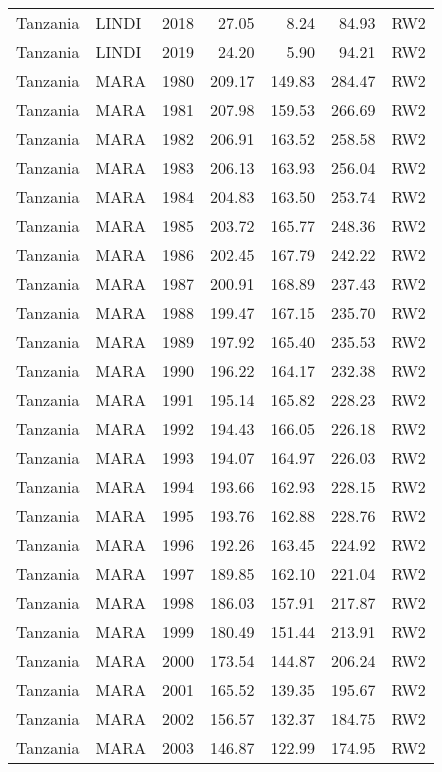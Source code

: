 \begin{longtable}{lllrrrl}
  Tanzania & LINDI & 2018 & 27.05 & 8.24 & 84.93 & RW2 \\ 
  Tanzania & LINDI & 2019 & 24.20 & 5.90 & 94.21 & RW2 \\ 
  Tanzania & MARA & 1980 & 209.17 & 149.83 & 284.47 & RW2 \\ 
  Tanzania & MARA & 1981 & 207.98 & 159.53 & 266.69 & RW2 \\ 
  Tanzania & MARA & 1982 & 206.91 & 163.52 & 258.58 & RW2 \\ 
  Tanzania & MARA & 1983 & 206.13 & 163.93 & 256.04 & RW2 \\ 
  Tanzania & MARA & 1984 & 204.83 & 163.50 & 253.74 & RW2 \\ 
  Tanzania & MARA & 1985 & 203.72 & 165.77 & 248.36 & RW2 \\ 
  Tanzania & MARA & 1986 & 202.45 & 167.79 & 242.22 & RW2 \\ 
  Tanzania & MARA & 1987 & 200.91 & 168.89 & 237.43 & RW2 \\ 
  Tanzania & MARA & 1988 & 199.47 & 167.15 & 235.70 & RW2 \\ 
  Tanzania & MARA & 1989 & 197.92 & 165.40 & 235.53 & RW2 \\ 
  Tanzania & MARA & 1990 & 196.22 & 164.17 & 232.38 & RW2 \\ 
  Tanzania & MARA & 1991 & 195.14 & 165.82 & 228.23 & RW2 \\ 
  Tanzania & MARA & 1992 & 194.43 & 166.05 & 226.18 & RW2 \\ 
  Tanzania & MARA & 1993 & 194.07 & 164.97 & 226.03 & RW2 \\ 
  Tanzania & MARA & 1994 & 193.66 & 162.93 & 228.15 & RW2 \\ 
  Tanzania & MARA & 1995 & 193.76 & 162.88 & 228.76 & RW2 \\ 
  Tanzania & MARA & 1996 & 192.26 & 163.45 & 224.92 & RW2 \\ 
  Tanzania & MARA & 1997 & 189.85 & 162.10 & 221.04 & RW2 \\ 
  Tanzania & MARA & 1998 & 186.03 & 157.91 & 217.87 & RW2 \\ 
  Tanzania & MARA & 1999 & 180.49 & 151.44 & 213.91 & RW2 \\ 
  Tanzania & MARA & 2000 & 173.54 & 144.87 & 206.24 & RW2 \\ 
  Tanzania & MARA & 2001 & 165.52 & 139.35 & 195.67 & RW2 \\ 
  Tanzania & MARA & 2002 & 156.57 & 132.37 & 184.75 & RW2 \\ 
  Tanzania & MARA & 2003 & 146.87 & 122.99 & 174.95 & RW2 \\ 

\end{longtable}
